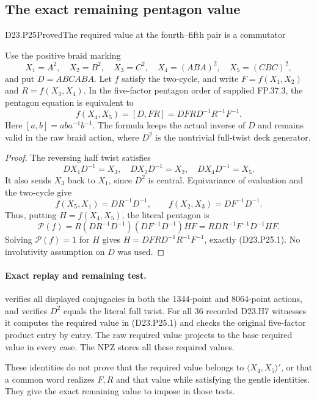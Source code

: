 \subsection{The exact remaining pentagon value}

\begin{statement}{D23.P25}{Proved}{The required value at the fourth--fifth pair is a commutator}
\end{statement}
Use the positive braid marking
\[
 X_1=A^2,\quad X_2=B^2,\quad X_3=C^2,\quad
 X_4=(ABA)^2,\quad X_5=(CBC)^2,
\]
and put $D=ABCABA$. Let $f$ satisfy the two-cycle, and
write $F=f(X_1,X_2)$ and $R=f(X_3,X_4)$. In the
five-factor pentagon order of supplied FP.37.3, the
pentagon equation is equivalent to
\[
 \boxed{\quad f(X_4,X_5)=[D,FR]
            =DFRD^{-1}R^{-1}F^{-1}.\quad}                 \tag{D23.P25.1}
\]
Here $[a,b]=aba^{-1}b^{-1}$. The formula keeps the actual
inverse of $D$ and remains valid in the raw braid action,
where $D^2$ is the nontrivial full-twist deck generator.

\begin{proof}
The reversing half twist satisfies
\[
 DX_1D^{-1}=X_3,\quad DX_2D^{-1}=X_2,\quad
 DX_4D^{-1}=X_5.
\]
It also sends $X_3$ back to $X_1$, since $D^2$ is
central. Equivariance of evaluation and the two-cycle give
\[
 f(X_5,X_1)=DR^{-1}D^{-1},\qquad
 f(X_2,X_3)=DF^{-1}D^{-1}.
\]
Thus, putting $H=f(X_4,X_5)$, the literal pentagon is
\[
 \mathcal P(f)
   =R(DR^{-1}D^{-1})(DF^{-1}D^{-1})HF
   =RDR^{-1}F^{-1}D^{-1}HF.
\]
Solving $\mathcal P(f)=1$ for $H$ gives
$H=DFRD^{-1}R^{-1}F^{-1}$, exactly (D23.P25.1).
No involutivity assumption on $D$ was used.
\end{proof}

\paragraph{Exact replay and remaining test.}
 verifies all displayed
conjugacies in both the 1344-point and 8064-point actions,
and verifies $D^2$ equals the literal full twist. For
all 36 recorded D23.H7 witnesses it computes the
required value in (D23.P25.1) and checks the original
five-factor product entry by entry. The raw required
value projects to the base required value in every case.
The NPZ stores all these required values.

These identities do not prove that the required value
belongs to $\langle X_4,X_5\rangle'$, or that a common
word realizes $F,R$ and that value while satisfying
the gentle identities. They give the exact remaining
value to impose in those tests.
